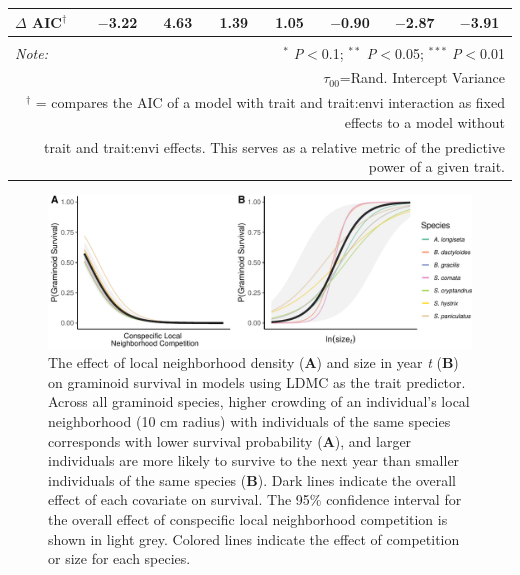 \documentclass[12pt, letterpaper]{article}
\begin{document}
\begin{table}[h]
{\begin{tabular}{lccccccc}
\hline 
\rowcolor[gray]{.95}$\Delta$ AIC$^\dagger$ & $-$3.22 & 4.63 & 1.39 & 1.05 & $-$0.90 & $-$2.87 & $-$3.91 \\
\hline 
\hline \\[-1.8ex] 
\textit{Note:}  & \multicolumn{7}{r}{$^{*}$ \textit{P}$<$0.1; $^{**}$ \textit{P}$<$0.05; $^{***}$ \textit{P}$<$0.01} \\ 
\multicolumn{8}{r}{$\tau_{00}$=Rand. Intercept Variance}\\ 
\multicolumn{8}{r}{$^\dagger$ = compares the AIC of a model with trait and trait:envi interaction as fixed effects to a model without}\\
\multicolumn{8}{r}{trait and trait:envi effects. This serves as a relative metric of the predictive power of a given trait.}
\end{tabular} }
\end{table} 

\begin{figure}
    \centering
    \includegraphics[width=.8\textwidth]{survEffectPlots-1.pdf}
    \caption{The effect of local neighborhood density (\textbf{A}) and size in year \textit{t} (\textbf{B}) on graminoid survival in models using LDMC as the trait predictor. Across all graminoid species, higher crowding of an individual's local neighborhood (10 cm radius) with individuals of the same species corresponds with lower survival probability (\textbf{A}), and larger individuals are more likely to survive to the next year than smaller individuals of the same species (\textbf{B}). Dark lines indicate the overall effect of each covariate on survival. The 95\% confidence interval for the overall effect of conspecific local neighborhood competition is shown in light grey. Colored lines indicate the effect of competition or size for each species.}
    \label{fig:Effects_Survival}
\end{figure}
\end{document}
